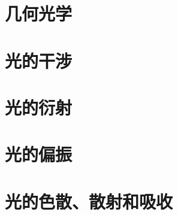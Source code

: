\documentclass[12pt]{book}
\begin{document}
\chapter{几何光学}
\newpage



\chapter{光的干涉}
\newpage



\chapter{光的衍射}
\newpage



\chapter{光的偏振}
\newpage



\chapter{光的色散、散射和吸收}
\newpage



%

%


%
\end{document}
